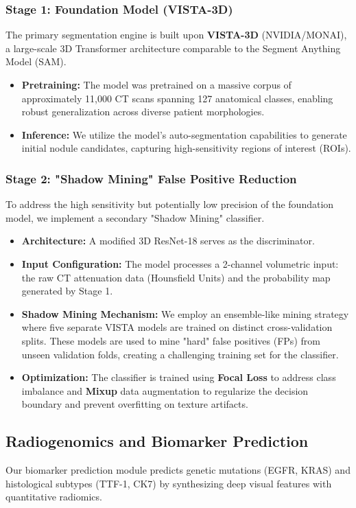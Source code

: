 \documentclass[10pt, twocolumn, letterpaper]{article}
\begin{document}
\subsubsection{Stage 1: Foundation Model (VISTA-3D)}
The primary segmentation engine is built upon \textbf{VISTA-3D} (NVIDIA/MONAI), a large-scale 3D Transformer architecture comparable to the Segment Anything Model (SAM).
\begin{itemize}
    \item \textbf{Pretraining:} The model was pretrained on a massive corpus of approximately 11,000 CT scans spanning 127 anatomical classes, enabling robust generalization across diverse patient morphologies.
    \item \textbf{Inference:} We utilize the model's auto-segmentation capabilities to generate initial nodule candidates, capturing high-sensitivity regions of interest (ROIs).
\end{itemize}

\subsubsection{Stage 2: "Shadow Mining" False Positive Reduction}
To address the high sensitivity but potentially low precision of the foundation model, we implement a secondary "Shadow Mining" classifier.
\begin{itemize}
    \item \textbf{Architecture:} A modified 3D ResNet-18 serves as the discriminator.
    \item \textbf{Input Configuration:} The model processes a 2-channel volumetric input: the raw CT attenuation data (Hounsfield Units) and the probability map generated by Stage 1.
    \item \textbf{Shadow Mining Mechanism:} We employ an ensemble-like mining strategy where five separate VISTA models are trained on distinct cross-validation splits. These models are used to mine "hard" false positives (FPs) from unseen validation folds, creating a challenging training set for the classifier.
    \item \textbf{Optimization:} The classifier is trained using \textbf{Focal Loss} to address class imbalance and \textbf{Mixup} data augmentation to regularize the decision boundary and prevent overfitting on texture artifacts.
\end{itemize}

\subsection{Radiogenomics and Biomarker Prediction}
Our biomarker prediction module predicts genetic mutations (EGFR, KRAS) and histological subtypes (TTF-1, CK7) by synthesizing deep visual features with quantitative radiomics.
\end{document}
